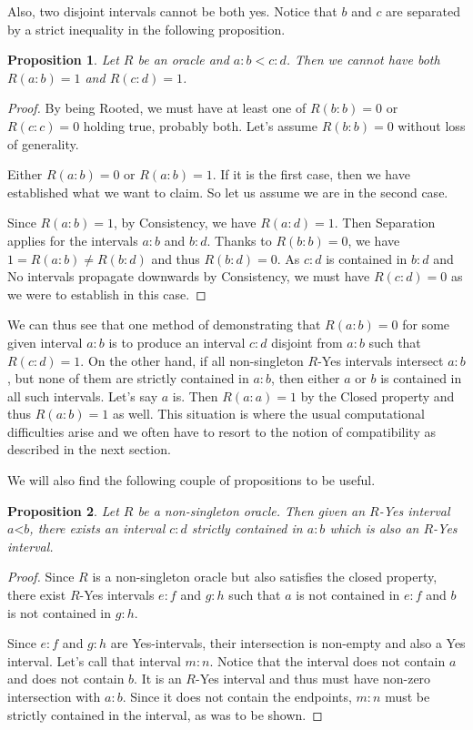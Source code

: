 \documentclass[12pt]{article}
\newtheorem{proposition}{Proposition}
\theoremstyle{remark}
\newcommand{\lt}{\mathord{<}}
\begin{document}
Also, two disjoint intervals cannot be both yes. Notice that $b$ and $c$ are separated by a strict inequality in the following proposition. 

\begin{proposition} \label{pr:disjoint}
Let $R$ be an oracle and $a:b < c:d$. Then we cannot have both $R(a:b) = 1$ and $R(c:d) = 1$. 
\end{proposition}

\begin{proof}
By being Rooted, we must have at least one of $R(b:b) = 0$ or $R(c:c) = 0$ holding true, probably both. Let's assume $R(b:b) = 0$ without loss of generality.
 
Either $R(a:b) = 0$ or $R(a:b)=1$. If it is the first case, then we have established what we want to claim. So let us assume we are in the second case. 
 
Since $R(a:b) = 1$,  by Consistency, we have $R(a:d) = 1$. Then Separation applies for the intervals $a:b$ and $b:d$. Thanks to $R(b:b) = 0$, we have $1 = R(a:b) \neq R(b:d)$ and thus $R(b:d) = 0$. As $c:d$ is contained in $b:d$ and No intervals propagate downwards by Consistency, we must have $R(c:d)=0$  as we were to establish in this case. 
\end{proof}

We can thus see that one method of demonstrating that $R(a:b)=0$ for some given interval $a:b$ is to produce an interval $c:d$ disjoint from $a:b$ such that $R(c:d)=1$. On the other hand, if all non-singleton $R$-Yes intervals intersect $a:b$, but none of them are strictly contained in $a:b$, then either $a$ or $b$ is contained in all such intervals. Let's say $a$ is. Then $R(a:a)=1$ by the Closed property and thus $R(a:b)=1$ as well. This situation is where the usual computational difficulties arise and we often have to resort to the notion of compatibility as described in the next section. 

We will also find the following couple of propositions to be useful. 

\begin{proposition}\label{pr:subinter}
Let $R$ be a non-singleton oracle. Then given an $R$-Yes interval $a\lt b$, there exists an interval $c:d$ strictly contained in $a:b$ which is also an $R$-Yes interval. 
\end{proposition}

\begin{proof}
Since $R$ is a non-singleton oracle but also satisfies the closed property, there exist $R$-Yes intervals $e:f$ and $g:h$ such that $a$ is not contained in $e:f$ and $b$ is not contained in $g:h$. 

Since $e:f$ and $g:h$ are Yes-intervals, their intersection is non-empty and also a Yes interval. Let's call that interval $m:n$.  Notice that the interval does not contain $a$ and does not contain $b$. It is an $R$-Yes interval and thus must have non-zero intersection with $a:b$. Since it does not contain the endpoints, $m:n$ must be strictly contained in the interval, as was to be shown. 
\end{proof}
\end{document}
